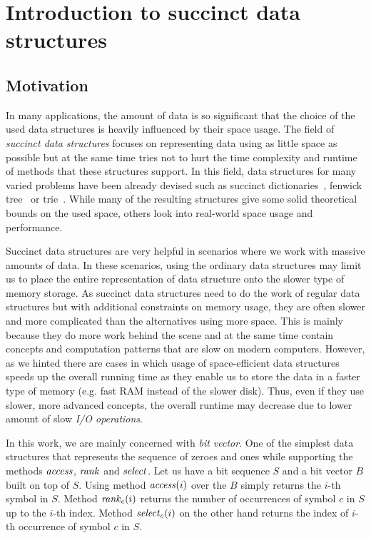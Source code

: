 \chapter{Introduction to succinct data structures}
\label{kap:kap1}


\section{Motivation}

In many applications, the amount of data is so significant that the choice of
the used data structures is heavily influenced by their space usage. The field
of \textit{succinct data structures} focuses on representing data using as little
space as possible but at the same time tries not to hurt the time complexity and
runtime of methods that these structures support. In this field, data structures for many
varied problems have been already devised such as succinct dictionaries~\citep{raman2007succinct},
fenwick tree~\citep{bille2017succinct} or trie~\citep{grossi2015fast}. While many of
the resulting structures give some solid theoretical bounds on the used space, others look
into real-world space usage and performance.

Succinct data structures are very helpful in scenarios where we work with massive
amounts of data. In these scenarios, using the ordinary data structures may limit us to place
the entire representation of data structure onto the slower type of memory storage. As succinct
data structures need to do the work of regular data structures but with additional constraints
on memory usage, they are often slower and more complicated than the alternatives using more
space. This is mainly because they do more work behind the scene and at the same time contain
concepts and computation patterns that are slow on modern computers. However, as we hinted
there are cases in which usage of space-efficient data structures speeds up the overall
running time as they enable us to store the data in a faster type of memory (e.g. fast RAM
instead of the slower disk). Thus, even if they use slower, more advanced concepts, the overall
runtime may decrease due to lower amount of slow \textit{I/O operations}.

In this work, we are mainly concerned with \textit{bit vector}. One of the simplest
data structures that represents the sequence of zeroes and ones while supporting the
methods $\mathit{access}$, $\mathit{rank}$ and $\mathit{select}$. Let us have a bit sequence $S$ and a bit
vector $B$ built on top of $S$. Using method $\mathit{access}(i)$ over the $B$ simply returns
the $i$-th symbol in $S$. Method $\mathit{rank}_c(i)$ returns the number of occurrences of
symbol $c$ in $S$ up to the $i$-th index. Method $\mathit{select}_c(i)$ on the other hand
returns the index of $i$-th occurrence of symbol $c$ in $S$.

